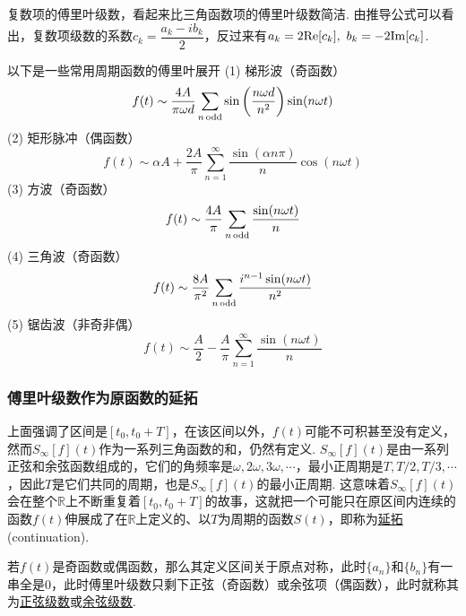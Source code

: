 \documentclass[UTF8]{ctexart}
\newcommand{\trm}[1]{{\rm #1}}
\begin{document}
复数项的傅里叶级数，看起来比三角函数项的傅里叶级数简洁. 由推导公式可以看出，复数项级数的系数\(c_k=\dfrac{a_k-ib_k}{2}\)，反过来有\(a_k=2\trm{Re}[c_k], \,\, b_k=-2\trm{Im}[c_k]\).

以下是一些常用周期函数的傅里叶展开
\newline
(1) 梯形波（奇函数）
\[f(t)\sim\frac{4A}{\pi\omega d}\sum_{n\,\trm{odd}}\sin\left(\frac{n\omega d}{n^2}\right)\sin(n\omega t)\]
(2) 矩形脉冲（偶函数）
\[f(t)\sim\alpha A + \frac{2A}{\pi}\sum_{n=1}^{\infty}\frac{\sin(\alpha n \pi)}{n} \cos(n\omega t)\]
(3) 方波（奇函数）
\[f(t) \sim \frac{4A}{\pi}\sum_{n\,\trm{odd}} \frac{\sin(n\omega t)}{n}\]
(4) 三角波（奇函数）
\[f(t) \sim \frac{8A}{\pi^2}\sum_{n\,\trm{odd}}\frac{i^{n-1}\sin(n\omega t)}{n^2}\]
(5) 锯齿波（非奇非偶）
\[f(t) \sim \frac{A}{2}-\frac{A}{\pi}\sum_{n=1}^{\infty} \frac{\sin(n\omega t)}{n}\]


\vspace{1cm}

\subsubsection{傅里叶级数作为原函数的延拓}

上面强调了区间是\([t_0,t_0+T]\)，在该区间以外，\(f(t)\)可能不可积甚至没有定义，然而\(S_{\infty}[f](t)\)作为一系列三角函数的和，仍然有定义. \(S_{\infty}[f](t)\)是由一系列正弦和余弦函数组成的，它们的角频率是\(\omega, 2\omega, 3\omega, \cdots\)，最小正周期是\(T, T/2, T/3, \cdots\)，因此\(T\)是它们共同的周期，也是\(S_{\infty}[f](t)\)的最小正周期. 这意味着\(S_{\infty}[f](t)\)会在整个\(\mathbb{R}\)上不断重复着\([t_0,t_0+T]\)的故事，这就把一个可能只在原区间内连续的函数\(f(t)\)伸展成了在\(\mathbb{R}\)上定义的、以\(T\)为周期的函数\(S(t)\)，即称为\uline{延拓}(continuation).

若\(f(t)\)是奇函数或偶函数，那么其定义区间关于原点对称，此时\(\{a_n\}\)和\(\{b_n\}\)有一串全是\(0\)，此时傅里叶级数只剩下正弦（奇函数）或余弦项（偶函数），此时就称其为\uline{正弦级数}或\uline{余弦级数}. 
\end{document}
